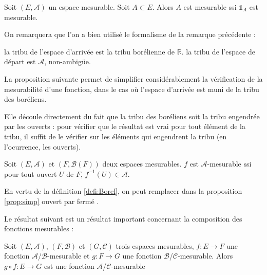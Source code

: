 \documentclass[../integ-proba.tex]{subfiles}
\begin{document}
  \begin{prop}
    \label{prop:lienensfctmes}
    Soit $\left(E, \mathcal{A}\right)$ un espace mesurable.
    Soit $A\subset E$.
    Alors $A$ est mesurable ssi $\mathds{1}_A$ est mesurable.
  \end{prop}

  \begin{rem}
    On remarquera que l'on a bien utilisé le formalisme de la remarque précédente :
    \begin{itemize}
      \itemb la tribu de l'espace d'arrivée est la tribu borélienne de $\mathbb{R}$.
      \itemb la tribu de l'espace de départ est $\mathcal{A}$, non-ambigüe.
    \end{itemize}
  \end{rem}

  La proposition suivante permet de simplifier considérablement la vérification de la mesurabilité d'une fonction, dans le cas où l'espace d'arrivée est muni de la tribu des boréliens.

  Elle découle directement du fait que la tribu des boréliens soit la tribu engendrée par les ouverts :
  pour vérifier que le résultat est vrai pour tout élément de la tribu, il suffit de le vérifier sur les éléments qui engendrent la tribu (en l'ocurrence, les ouverts).

  \begin{prop}
    \label{prop:simp}
    Soit $\left(E, \mathcal{A}\right)$ et $\left(F, \mathcal{B}(F)\right)$ deux espaces mesurables.
    $f$ est $\mathcal{A}$-mesurable ssi pour tout ouvert $U$ de $F$, $f^{-1}(U) \in \mathcal{A}$.
  \end{prop}

  \begin{rem}
    En vertu de la définition \ref{defi:Borel}, on peut remplacer dans la proposition \ref{prop:simp} \og ouvert \fg par \og fermé \fg.
  \end{rem}

  Le résultat suivant est un résultat important concernant la composition des fonctions mesurables :

  \begin{prop}
    Soit $\left(E,\mathcal{A}\right)$, $\left(F,\mathcal{B}\right)$ et $\left(G,\mathcal{C}\right)$ trois espaces mesurables,
    $f : E \longrightarrow F$ une fonction $\mathcal{A}$/$\mathcal{B}$-mesurable et $g : F \longrightarrow G$ une fonction $\mathcal{B}$/$\mathcal{C}$-mesurable.
    Alors $g \circ f : E \longrightarrow G$ est une fonction $\mathcal{A}$/$\mathcal{C}$-mesurable
  \end{prop}
\end{document}
